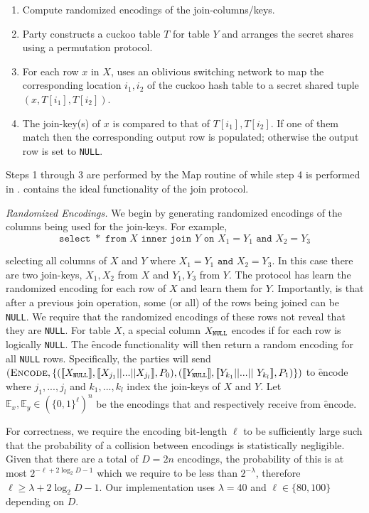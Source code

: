 \begin{enumerate}
	\item Compute randomized encodings of the join-columns/keys. 
	\item Party  constructs a cuckoo table $T$ for table $Y$ and arranges the secret shares using a permutation protocol. 
	\item For each row $x$ in $X$,  uses an oblivious switching network to map  the corresponding location $i_1,i_2$ of the cuckoo hash table to a secret shared tuple $(x, T[{i_1}], T[{i_2}])$.
	\item The join-key(s) of $x$ is compared to that of $T[{i_1}], T[{i_2}]$. If one of them match then the corresponding output row is populated; otherwise the output row is set to \texttt{NULL}.
\end{enumerate} 
Steps 1 through 3 are performed by the Map routine of  while step 4 is performed in .  contains the ideal functionality of the join protocol.



\emph{Randomized Encodings.}
We begin by generating randomized encodings of the columns being used for the join-keys. For example, 
\iffullversion
$$
	\texttt{select }* \texttt{ from } X \texttt{ inner join } Y \texttt{ on } X_1 = Y_1 \texttt{ and } X_2 = Y_3
$$

\else
selecting all columns of $X$ and $Y$ where $X_1 = Y_1 \texttt{ and } X_2 = Y_3$.
\fi
In this case there are two join-keys, $X_1,X_2$ from $X$ and $Y_1,Y_3$ from $Y$. The protocol has  learn the randomized encoding for each row of $X$ and  learn them for $Y$. Importantly, is that after a previous join operation, some (or all) of the rows being joined can be \texttt{NULL}. We require that the randomized encodings of these rows not reveal that they are \texttt{NULL}. For table $X$, a special column $X_\texttt{NULL}$ encodes if for each row is logically \texttt{NULL}. The \f{encode} functionality will then return a random encoding for all \texttt{NULL} rows. Specifically, the parties will send $(\textsc{Encode}, \{(\share{\XNull}, \share{X_{j_1}||...||X_{j_l}}, \Party{0}), (\share{\YNull}, \share{Y_{k_1}||...||$ $Y_{k_l}}, \Party{1})\})$ to \f{encode} where $j_1,...,j_l$ and $k_1,...,k_l$ index the join-keys of $X$ and $Y$. Let $\mathbb{E}_x,\mathbb{E}_y\in(\{0,1\}^{\ell})^n$ be the encodings that  and  respectively receive from \f{encode}.


For correctness, we require the encoding bit-length $\ell$ to be sufficiently large such that the probability of a collision between encodings is statistically negligible. Given that there are a total of $D=2n$ encodings, the probability of this is at most $2^{-\ell+2\log_2 D-1}$ which we require to be less than $2^{-\lambda}$, therefore $\ell\geq \lambda+2\log_2 D -1$. Our implementation uses $\lambda=40$ and $\ell\in\{80,100\}$ depending on $D$.

